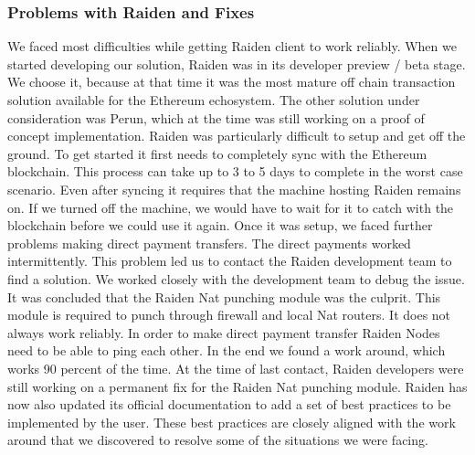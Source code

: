 \subsubsection{Problems with Raiden and Fixes}
We faced most difficulties while getting Raiden client to work reliably. When we started developing our solution, Raiden was in its developer preview / beta stage. We choose it, because at that time it was the most mature off chain transaction solution available for the Ethereum echosystem. The other solution under consideration was Perun, which at the time was still working on a proof of concept implementation. Raiden was particularly difficult to setup and get off the ground. To get started it first needs to completely sync with the Ethereum blockchain. This process can take up to 3 to 5 days to complete in the worst case scenario. Even after syncing it requires that the machine hosting Raiden remains on. If we turned off the machine, we would have to wait for it to catch with the blockchain before we could use it again. Once it was setup, we faced further problems making direct payment transfers. The direct payments worked intermittently.  This problem led us to contact the Raiden development team to find a solution. We worked closely with the development team to debug the issue. It was concluded that the Raiden Nat punching module was the culprit. This module is required to punch through firewall and local Nat routers. It does not always work reliably. In order to make direct payment transfer Raiden Nodes need to be able to ping each other. In the end we found a work around, which works 90 percent of the time. At the time of last contact, Raiden developers were still working on a permanent fix for the Raiden Nat punching module. Raiden has now also updated its official documentation \cite{rad:001} to add a set of best practices to be implemented by the user. These best practices are closely aligned with the work around that we discovered to resolve some of the situations we were facing.
\vspace{0.5cm}
